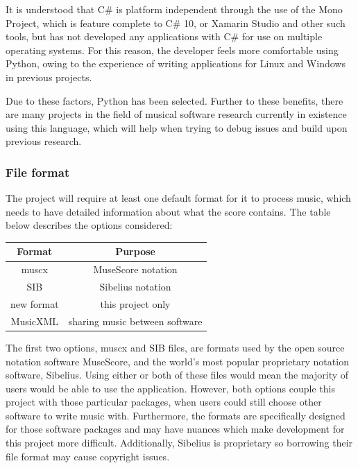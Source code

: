 It is understood that C\# is platform independent through the use of the Mono Project, which is feature complete to C\# 10\parencite{MonoDev}, or Xamarin Studio and other such tools, but has not developed any applications with C\# for use on multiple operating systems. For this reason, the developer feels more comfortable using Python, owing to the experience of writing applications for Linux and Windows in previous projects. 

Due to these factors, Python has been selected. Further to these benefits, there are many projects in the field of musical software research currently in existence using this language, \parencite{pmus} which will help when trying to debug issues and build upon previous research.

\subsubsection{File format}
The project will require at least one default format for it to process music, which needs to have detailed information about what the score contains. The table below describes the options considered:

\begin{center}
\begin{tabular}{| c | c | } \hline
  {Format} & {Purpose} \\ \hline
  muscx & MuseScore notation \\ \hline
  SIB & Sibelius notation \\ \hline
  new format & this project only \\ \hline
  MusicXML & sharing music between software \\ \hline
\end{tabular}
\end{center}
The first two options, muscx and SIB files, are formats used by the open source notation software MuseScore\parencite{MuseTour}, and the world's most popular proprietary notation software, Sibelius\parencite{avid}. Using either or both of these files would mean the majority of users would be able to use the application. 
However, both options couple this project with those particular packages, when users could still choose other software to write music with. Furthermore, the formats are specifically designed for those software packages and may have nuances which make development for this project more difficult. Additionally, Sibelius is proprietary so borrowing their file format may cause copyright issues.

